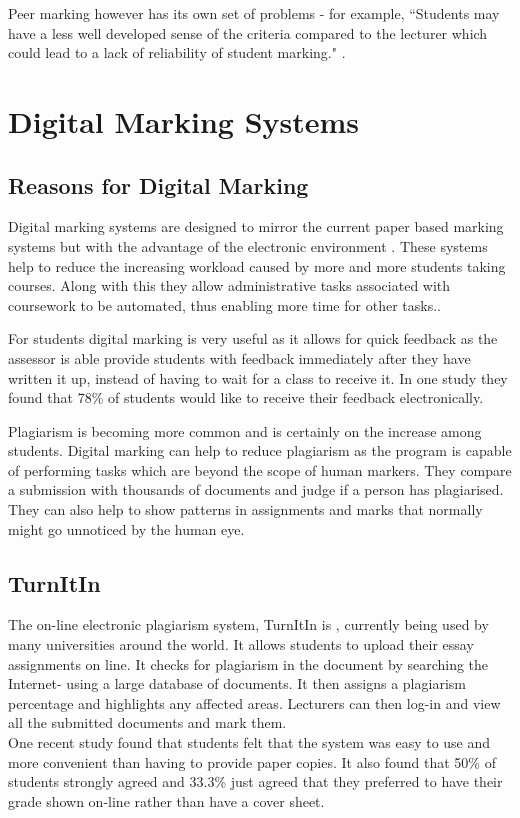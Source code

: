 \documentclass[11pt]{report}
\begin{document}
Peer marking however has its own set of problems - for example, ``Students may have a less well developed sense of the criteria compared to the lecturer which could lead to a lack of reliability of student marking." \cite{orsmond_use_2000-1}.



\section{Digital Marking Systems}

\subsection{Reasons for Digital Marking}
Digital marking systems are designed to mirror the current paper based marking systems but with the advantage of the electronic environment \cite{heinrich_online_2003-1}. These systems help to reduce the increasing workload caused by more and more students taking courses. Along with this they allow administrative tasks associated with coursework to be automated, thus enabling more time for other tasks.\cite{joy_effective_1998-1}.

For students digital marking is very useful as it allows for quick feedback as the assessor is able provide students with feedback immediately after they have written it up, instead of having to wait for a class to receive it. In one study \cite{dahl_turnitin_2007-1} they found that 78\% of students would like to receive their feedback  electronically. 

Plagiarism is becoming more common \cite{derby_duplication_2008-1} and is certainly on the increase among students. Digital marking can help to reduce plagiarism as the program is capable of performing tasks which are beyond the scope of human markers. They compare a submission with thousands of documents and judge if a person has plagiarised. They can also help to show patterns in assignments and marks that normally might go unnoticed by the human eye.

\subsection{TurnItIn}
The on-line electronic plagiarism system, TurnItIn is \cite{_turnitin_????-1}, currently being used by many universities around the world. It allows students to upload their essay assignments on line. It checks for plagiarism in the document by searching the Internet- using a large database of documents. It then assigns a plagiarism percentage and highlights any affected areas. Lecturers can then log-in and view all the submitted documents and mark them.\\
One recent study \cite{dahl_turnitin_2007-1} found that students felt that the system was easy to use and more convenient than having to provide paper copies. It also found that 50\% of students strongly agreed and 33.3\% just agreed that they preferred to have their grade shown on-line rather than have a cover sheet.
\end{document}
